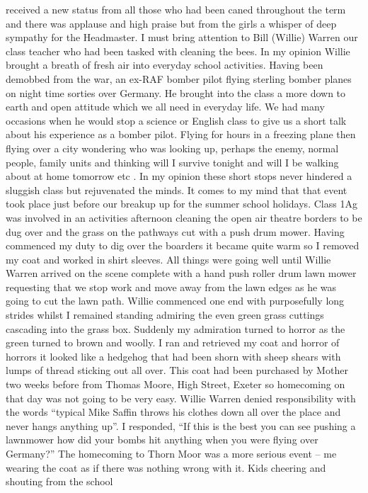 received a new status from all those who had been caned throughout the term and
there was applause and high praise but from the girls a whisper of deep
sympathy for the Headmaster. I must bring attention to Bill (Willie) Warren our
class teacher who had been tasked with cleaning the bees.  In my opinion Willie
brought a breath of fresh air into everyday school activities.  Having been
demobbed from the war, an ex-RAF bomber pilot flying sterling bomber planes on
night time sorties over Germany.  He brought into the class a more down to
earth and open attitude which we all need in everyday life. We had many
occasions when he would stop a science or English class to give us a short talk
about his experience as a bomber pilot.  Flying for hours in a freezing plane
then flying over a city wondering who was looking up, perhaps the enemy, normal
people, family units and thinking will I survive tonight and will I be walking
about at home tomorrow etc .  In my opinion these short stops never hindered a
sluggish class but rejuvenated the minds.   It comes to my mind that that event
took place just before our breakup up for the summer school holidays. Class 1Ag
was involved in an activities afternoon cleaning the open air theatre borders
to be dug over and the grass on the pathways cut with a push drum mower. Having
commenced my duty to dig over the boarders it became quite warm so I removed my
coat and worked in shirt sleeves.  All things were going well until Willie
Warren arrived on the scene complete with a hand push roller drum lawn mower
requesting that we stop work and move away from the lawn edges as he was going
to cut the lawn path.  Willie commenced one end with purposefully long strides
whilst I remained standing admiring the even green grass cuttings cascading
into the grass box.  Suddenly my admiration turned to horror as the green
turned to brown and woolly.  I ran and retrieved my coat and horror of horrors
it looked like a hedgehog that had been shorn with sheep shears with lumps of
thread sticking out all over.  This coat had been purchased by Mother two weeks
before from Thomas Moore, High Street, Exeter so homecoming on that day was not
going to be very easy. Willie Warren denied responsibility with the words
``typical Mike Saffin throws his clothes down all over the place and never
hangs anything up''.  I responded, ``If this is the best you can see pushing a
lawnmower how did your bombs hit anything when you were flying over Germany?''
The homecoming to Thorn Moor was a more serious event – me wearing the coat as
if there was nothing wrong with it. Kids cheering and shouting from the school
